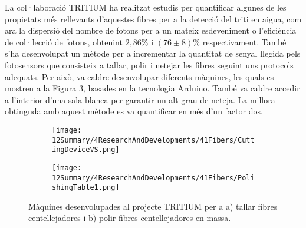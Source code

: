 La col·laboració TRITIUM ha realitzat estudis per quantificar algunes de les propietats més rellevants d'aquestes fibres per a la detecció del triti en aigua, com ara la dispersió del nombre de fotons per a un mateix esdeveniment o l'eficiència de col·lecció de fotons, obtenint $2,86\%$ i $(76 \pm 8)\%$ respectivament. També s'ha desenvolupat un mètode per a incrementar la quantitat de senyal llegida pels fotosensors que consisteix a tallar, polir i netejar les fibres seguint uns protocols adequats. Per això, va caldre desenvolupar diferents màquines, les quals es mostren a la Figura \ref{fig:MaquinesTRITIUM}, basades en la tecnologia Arduino. També va caldre accedir a l'interior d'una sala blanca per garantir un alt grau de neteja. La millora obtinguda amb aquest mètode es va quantificar en més d'un factor dos. 

\begin{figure}
\centering
    \begin{subfigure}[b]{0.5\textwidth}
    \centering
    \texttt{[image: 12Summary/4ResearchAndDevelopments/41Fibers/CuttingDeviceVS.png]}  
    \caption{\label{subfig:MaquinaTallar}}
    \end{subfigure}
    \hfill
    \begin{subfigure}[b]{0.45\textwidth}
    \centering
    \texttt{[image: 12Summary/4ResearchAndDevelopments/41Fibers/PolishingTable1.png]}  
    \caption{\label{subfig:MaquinaPolir}}
    \end{subfigure}
 \caption{Màquines desenvolupades al projecte TRITIUM per a a) tallar fibres centellejadores i b) polir fibres centellejadores en massa. \label{fig:MaquinesTRITIUM}}
\end{figure}